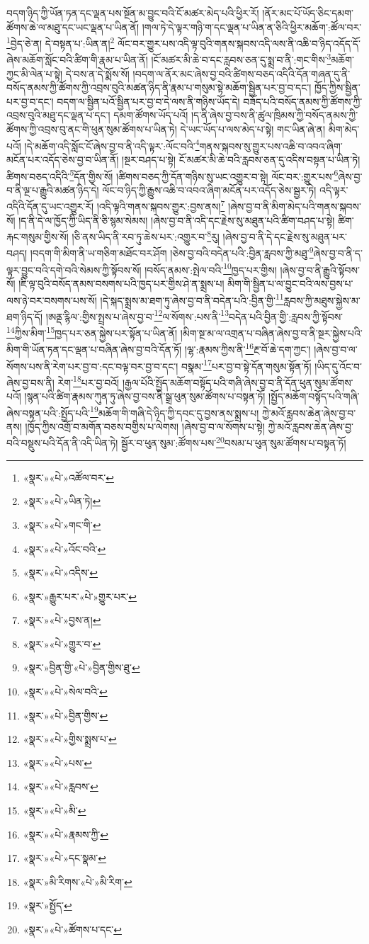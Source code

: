 བདག་ཉིད་ཀྱི་ཡོན་ཏན་དང་ལྡན་པས་སྔོན་མ་བྱུང་བའི་ངོ་མཚར་མེད་པའི་ཕྱིར་རོ། །ནོར་མང་པོ་ཡོད་ཅིང་དམག་ཚོགས་ཆེ་ལ་མཐུ་དང་ཡང་ལྡན་པ་ཡིན་ནོ། །གལ་ཏེ་དེ་ལྟར་གཉི་ག་དང་ལྡན་པ་ཡིན་ན་ཅིའི་ཕྱིར་མཆོག་:ཚོལ་བར་\footnote{«སྣར་»«པེ་»འཚོལ་བར་}བྱེད་ཅེ་ན། དེ་བསྟན་པ་:ཡིན་ན།\footnote{«སྣར་»«པེ་»ཡིན་ཏེ།} ལོང་བར་གྱུར་པས་འདི་ལྟ་བུའི་གནས་སྐབས་འདི་ལས་ནི་འཆི་བ་ཉིད་འདོད་དོ་ཞེས་མཆོག་སློང་བའི་ཚིག་གི་རྣམ་པ་ཡིན་ནོ། །ངོ་མཚར་མི་ཆེ་བ་དང་རླབས་ཅན་དུ་སྨྲ་བ་ནི་:གང་གིས་\footnote{«སྣར་»«པེ་»གང་གི་}མཆོག་ཀྱང་མི་ལེན་པ་སྟེ། དེ་བས་ན་དེ་སྨོས་སོ། །བདག་ལ་ནོར་མང་ཞེས་བྱ་བའི་ཚིགས་བཅད་འདིའི་དོན་གཞན་དུ་ནི་བསོད་ནམས་ཀྱི་ཚོགས་ཀྱི་འབྲས་བུའི་མཚན་ཉིད་ནི་རྣམ་པ་གསུམ་སྟེ་མཆོག་སྦྱིན་པར་བྱ་བ་དང་། ཁྱོད་ཀྱིས་སྦྱིན་པར་བྱ་བ་དང་། བདག་ལ་སྦྱིན་པའོ་སྦྱིན་པར་བྱ་བ་དེ་ལས་ནི་གཉིས་ཡོད་དེ། བཟོད་པའི་བསོད་ནམས་ཀྱི་ཚོགས་ཀྱི་འབྲས་བུའི་མཐུ་དང་ལྡན་པ་དང་། དམག་ཚོགས་ཡོད་པའོ། །ད་ནི་ཞེས་བྱ་བས་ནི་ཚུལ་ཁྲིམས་ཀྱི་བསོད་ནམས་ཀྱི་ཚོགས་ཀྱི་འབྲས་བུ་ནང་གི་ཕུན་སུམ་ཚོགས་པ་ཡིན་ཏེ། དེ་ཡང་ཡོད་པ་ལས་མེད་པ་སྟེ། གང་ཡིན་ཞེ་ན། མིག་མེད་པའོ། །དེ་མཆོག་འདི་སློང་ངོ་ཞེས་བྱ་བ་ནི་འདི་ལྟར་:ལོང་བའི་\footnote{«སྣར་»«པེ་»འོང་བའི་}གནས་སྐབས་སུ་གྱུར་པས་འཆི་བ་འབའ་ཞིག་མངོན་པར་འདོད་ཅེས་བྱ་བ་ཡིན་ནོ། །སྔར་བཤད་པ་སྟེ། ངོ་མཚར་མི་ཆེ་བའི་རླབས་ཅན་དུ་འདིས་བསྟན་པ་ཡིན་ཏེ། ཚིགས་བཅད་འདིའི་\footnote{«སྣར་»«པེ་»འདིས་}དོན་གྱིས་སོ། །ཚིགས་བཅད་ཀྱི་དོན་གཉིས་སུ་ཡང་འགྱུར་བ་སྟེ། ལོང་བར་:གྱུར་པས་\footnote{«སྣར་»རྒྱུར་པར་«པེ་»གྱུར་པར་}ཞེས་བྱ་བ་ནི་ལྔ་པ་རྒྱུའི་མཚན་ཉིད་དེ། ལོང་བ་ཉིད་ཀྱི་རྒྱུས་འཆི་བ་འབའ་ཞིག་མངོན་པར་འདོད་ཅེས་སྦྱར་ཏེ། འདི་ལྟར་འདིའི་དོན་དུ་ཡང་འགྱུར་རོ། །འདི་ལྟའི་གནས་སྐབས་གྱུར་:བྱས་ནས།\footnote{«སྣར་»«པེ་»བྱས་ན།} །ཞེས་བྱ་བ་ནི་མིག་མེད་པའི་གནས་སྐབས་སོ། །ད་ནི་དེ་ལ་ཁྱོད་ཀྱི་ཡིད་ནི་ཅི་སྙམ་སེམས། །ཞེས་བྱ་བ་ནི་འདི་དང་རྗེས་སུ་མཐུན་པའི་ཚིག་བཤད་པ་སྟེ། ཚིག་རྐང་གསུམ་གྱིས་སོ། །ཅི་ནས་ཡིད་ནི་རབ་ཏུ་ཆེས་པར་:འགྱུར་བ་\footnote{«སྣར་»«པེ་»གྱུར་བ་}རུ། །ཞེས་བྱ་བ་ནི་དེ་དང་རྗེས་སུ་མཐུན་པར་བཤད། །བདག་གི་མིག་ནི་ཡ་གཅིག་མཐོང་བར་ཤོག །ཅེས་བྱ་བའི་བདེན་པའི་:བྱིན་རླབས་ཀྱི་མཐུ་\footnote{«སྣར་»བྱིན་གྱི་«པེ་»བྱིན་གྱིས་ཐུ་}ཞེས་བྱ་བ་ནི་ད་ལྟར་བྱུང་བའི་དགེ་བའི་སེམས་ཀྱི་སྟོབས་སོ། །བསོད་ནམས་:སྤེལ་བའི་\footnote{«སྣར་»«པེ་»སེལ་བའི་}ཁྱད་པར་གྱིས། །ཞེས་བྱ་བ་ནི་རྒྱུའི་སྟོབས་སོ། །ཇི་ལྟ་བུའི་བསོད་ནམས་བསགས་པའི་ཁྱད་པར་གྱིས་ཤེ་ན་སྨྲས་པ། མིག་གི་སྦྱིན་པ་ལ་བྱུང་བའི་ལས་བྱས་པ་ལས་ཉེ་བར་བསགས་པས་སོ། །དེ་སྐད་སྨྲས་མ་ཐག་ཏུ་ཞེས་བྱ་བ་ནི་བདེན་པའི་:བྱིན་གྱི་\footnote{«སྣར་»«པེ་»བྱིན་གྱིས་}རླབས་ཀྱི་མཐུས་སྐྱེས་མ་ཐག་ཉིད་དོ། །ཨནྡ་རྙིལ་:གྱིས་སྤྲས་པ་ཞེས་བྱ་བ་\footnote{«སྣར་»«པེ་»གྱིས་སྨྲས་པ་}ལ་སོགས་:པས་ནི་\footnote{«སྣར་»«པེ་»པས་}བདེན་པའི་བྱིན་གྱི་:རླབས་ཀྱི་སྟོབས་\footnote{«སྣར་»«པེ་»རླབས་}ཀྱིས་མིག་\footnote{«སྣར་»«པེ་»མི་}ཁྱད་པར་ཅན་སྐྱེས་པར་སྟོན་པ་ཡིན་ནོ། །མིག་སྔ་མ་ལ་འགྲན་པ་བཞིན་ཞེས་བྱ་བ་ནི་སྔར་སྐྱེས་པའི་མིག་གི་ཡོན་ཏན་དང་ལྡན་པ་བཞིན་ཞེས་བྱ་བའི་དོན་ཏོ། །ལྷ་:རྣམས་ཀྱིས་ནི་\footnote{«སྣར་»«པེ་»རྣམས་ཀྱི་}རྔ་བོ་ཆེ་དག་ཀྱང་། །ཞེས་བྱ་བ་ལ་སོགས་པས་ནི་རེག་པར་བྱ་བ་:དང་བལྟ་བར་བྱ་བ་དང་། བསྣམ་\footnote{«སྣར་»«པེ་»དང་སྣམ་}པར་བྱ་བ་སྟེ་དོན་གསུམ་སྟོན་ཏོ། །ཡིད་དུ་འོང་བ་ཞེས་བྱ་བས་ནི། རེག་\footnote{«སྣར་»མི་རིགས་«པེ་»མི་རིག་}པར་བྱ་བའོ། །རྒྱལ་པོའི་སྤྱོད་མཆོག་བསྟོད་པའི་གཞི་ཞེས་བྱ་བ་ནི་དོན་ཕུན་སུམ་ཚོགས་པའོ། །སྙན་པའི་ཚིག་རྣམས་ཀུན་ཏུ་ཞེས་བྱ་བས་ནི་སྒྲ་ཕུན་སུམ་ཚོགས་པ་བསྟན་ཏོ། །སྤྱོད་མཆོག་བསྟོད་པའི་གཞི་ཞེས་བསྟན་པའི་:སྤྱོད་པའི་\footnote{«སྣར་»སྤྱོད་}མཆོག་གི་གཞི་དེ་ཉིད་ཀྱི་དབང་དུ་བྱས་ནས་སྨྲས་པ། ཀྱེ་མའོ་རླབས་ཆེན་ཞེས་བྱ་བ་ནས། །ཁྱོད་ཀྱིས་འགྲོ་བ་མགོན་བཅས་བགྱིས་པ་ལེགས། །ཞེས་བྱ་བ་ལ་སོགས་པ་སྟེ། ཀྱེ་མའོ་རླབས་ཆེན་ཞེས་བྱ་བའི་བསྡུས་པའི་དོན་ནི་འདི་ཡིན་ཏེ། སྦྱོར་བ་ཕུན་སུམ་:ཚོགས་པས་\footnote{«སྣར་»«པེ་»ཚོགས་པ་དང་}བསམ་པ་ཕུན་སུམ་ཚོགས་པ་བསྟན་ཏོ། 